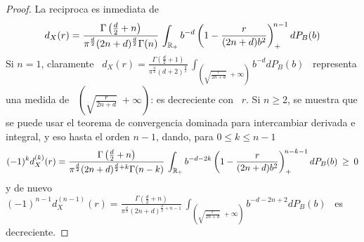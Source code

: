 \begin{proof}
  La reciproca es inmediata de
  \[
  d_X(r) = \frac{\Gamma\left( \frac{d}{2}  + n \right)}{\pi^{\frac{d}{2}} (2 n +
    d)^{\frac{d}{2}} \Gamma(n)} \, \int_{\mathbb{R}_+}  b^{-d} \left( 1 - \frac{r}{(2
      n + d) b^2} \right)_+^{\! n - 1} dP_B(b)
  \]
  Si  $n   =  1$,  claramente  \  $\displaystyle   d_X(r)  =  \frac{\Gamma\left(
      \frac{d}{2}   +  1   \right)}{\pi^{\frac{d}{2}}   (d+2)^{\frac{d}{2}}}  \,
  \int_{\left( \sqrt{\frac{r}{2  n + d}}  \; +\infty \right)} b^{-d}  dP_B(b)$ \
  representa  una  medida de  \  $\left( \sqrt{\frac{r}{2  n  +  d}} \;  +\infty
  \right)$: es decreciente con \ $r$. Si $n \ge 2$, se muestra que se puede usar
  el teorema de  convergencia dominada para intercambiar derivada  e integral, y
  eso hasta el orden $n-1$, dando, para $0 \le k \le n-1$
 \[
 (-1)^k     d_X^{(k)}(r)     =     \frac{\Gamma\left(    \frac{d}{2}     +     n
   \right)}{\pi^{\frac{d}{2}}   (2  n   +  d)^{\frac{d}{2}+k}   \Gamma(n-k)}  \,
 \int_{\mathbb{R}_+} b^{-d-2k} \left( 1 - \frac{r}{(2 n + d) b^2} \right)_+^{\! n - k
   - 1} dP_B(b) \: \ge \: 0
  \]
  y  de nuevo  \ $\displaystyle  (-1)^{n-1} d_X^{(n-1)}(r)  = \frac{\Gamma\left(
      \frac{d}{2} + n \right)}{\pi^{\frac{d}{2}} (2 n + d)^{\frac{d}{2}+n-1}} \,
  \int_{\left( \sqrt{\frac{r}{2 n + d}} \; +\infty \right)} b^{-d-2n+2} dP_B(b)$
  \ es decreciente.


\end{proof}
